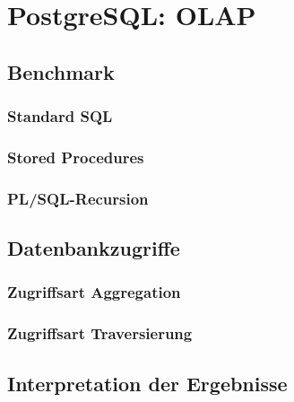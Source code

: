 \chapter{PostgreSQL: OLAP}
\section{Benchmark}
\subsection{Standard SQL}
\subsection{Stored Procedures}
\subsection{PL/SQL-Recursion}
\section{Datenbankzugriffe}
\subsection{Zugriffsart Aggregation}
\subsection{Zugriffsart Traversierung}
\section{Interpretation der Ergebnisse}
